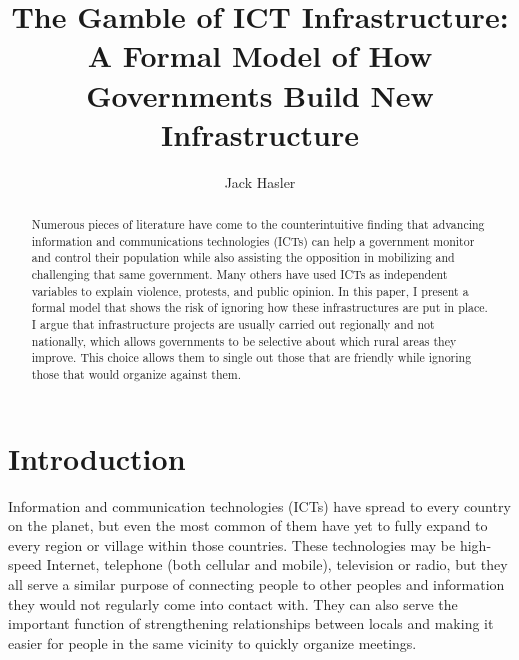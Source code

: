 \documentclass[12pt]{article}
\begin{document}
	\begin{titlingpage}
	
	\title{The Gamble of ICT Infrastructure: A Formal Model of How Governments Build New Infrastructure}
	\author{Jack Hasler}
	\maketitle


	\begin{abstract}
	Numerous pieces of literature have come to the counterintuitive finding that advancing information and communications technologies (ICTs) can help a government monitor and control their population while also assisting the opposition in mobilizing and challenging that same government. Many others have used ICTs as independent variables to explain violence, protests, and public opinion. In this paper, I present a formal model that shows the risk of ignoring how these infrastructures are put in place. I argue that infrastructure projects are usually carried out regionally and not nationally, which allows governments to be selective about which rural areas they improve. This choice allows them to single out those that are friendly while ignoring those that would organize against them. 
	\end{abstract}

	\end{titlingpage}
	
	\section{Introduction}
	Information and communication technologies (ICTs) have spread to every country on the planet, but even the most common of them have yet to fully expand to every region or village within those countries. These technologies may be high-speed Internet, telephone (both cellular and mobile), television or radio, but they all serve a similar purpose of connecting people to other peoples and information they would not regularly come into contact with. They can also serve the important function of strengthening relationships between locals and making it easier for people in the same vicinity to quickly organize meetings.
	
\end{document}
